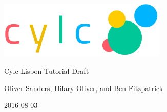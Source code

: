 \thispagestyle{empty}

\begin{titlepage}
    \begin{center}
        \includegraphics[width=0.6\textwidth]{resources/tex/cylc-logo}

        \Huge{Cylc Lisbon Tutorial Draft}

        \large{Oliver Sanders, Hilary Oliver, and Ben Fitzpatrick}

        \small{2016-08-03}
    \end{center}

\tableofcontents
\end{titlepage}
